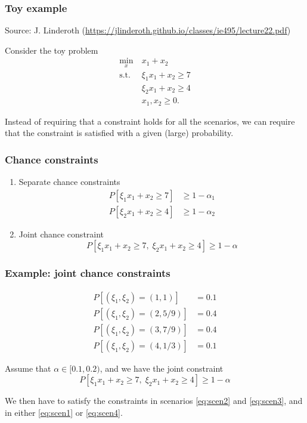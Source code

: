 \documentclass[aspectratio=169]{beamer}
\begin{document}
\begin{frame}
\frametitle{Toy example}

Source: J. Linderoth (\url{https://jlinderoth.github.io/classes/ie495/lecture22.pdf})

\mbox{}

Consider the toy problem
\begin{align*}
\min_x\ & x_1 + x_2 \\
\text{s.t. } & \xi_1 x_1 + x_2 \geq 7 \\
& \xi_2 x_1 + x_2 \geq 4 \\
& x_1, x_2 \geq 0.
\end{align*}

\mbox{} 

Instead of requiring that a constraint holds for all the scenarios, we can require that the constraint is satisfied with a given (large) probability.

\end{frame}

\begin{frame}
\frametitle{Chance constraints}

\begin{enumerate}
\item 
Separate chance constraints
\begin{align*}
P [ \xi_1x_1 + x_2 \geq 7 ] &\geq 1-\alpha_1 \\
P [ \xi_2x_1 + x_2 \geq 4 ] &\geq 1-\alpha_2
\end{align*}
\item
Joint chance constraint
\[
P [ \xi_1x_1 + x_2 \geq 7, \; \xi_2x_1 + x_2 \geq 4 ] \geq 1-\alpha
\]
\end{enumerate}

\end{frame}

\begin{frame}
\frametitle{Example: joint chance constraints}

\begin{align}
P[(\xi_1, \xi_2) = (1,1)] &= 0.1 \label{eq:scen1} \\
P[(\xi_1, \xi_2) = (2,5/9)] &= 0.4 \label{eq:scen2} \\
P[(\xi_1, \xi_2) = (3,7/9)] &= 0.4 \label{eq:scen3} \\
P[(\xi_1, \xi_2) = (4,1/3)] &= 0.1 \label{eq:scen4}
\end{align}

\mbox{}

Assume that $\alpha \in [0.1,0.2)$, and we have the joint constraint
\[
P [ \xi_1x_1 + x_2 \geq 7, \; \xi_2x_1 + x_2 \geq 4 ] \geq 1-\alpha
\]

\mbox{}

We then have to satisfy the constraints in scenarios \eqref{eq:scen2} and \eqref{eq:scen3}, and in either \eqref{eq:scen1} or \eqref{eq:scen4}.

\end{frame}
\end{document}
